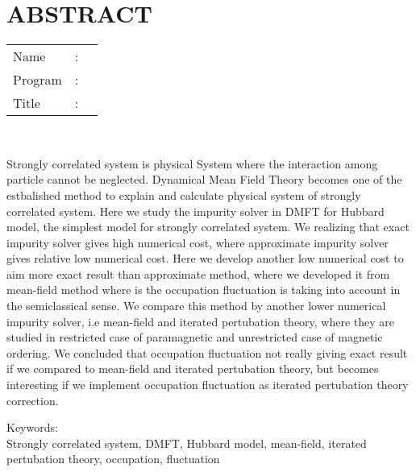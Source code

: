 %
%
%

\chapter*{ABSTRACT}

\vspace*{0.2cm}

\noindent \begin{tabular}{l l p{11.0cm}}
	Name&: & \penulis \\
	Program&: & \program \\
	Title&: & \judulInggris \\
\end{tabular} \\ 

\vspace*{0.5cm}

\noindent Strongly correlated system is physical System where the interaction among particle cannot be neglected. Dynamical Mean Field Theory becomes one of the estbalished method to explain and calculate physical system of strongly correlated system. Here we study the impurity solver in DMFT for Hubbard model, the simplest model for strongly correlated system. We realizing that exact impurity solver gives high numerical cost, where approximate impurity solver gives relative low numerical cost. Here we develop another low numerical cost to aim more exact result than approximate method, where we developed it from mean-field method where is the occupation fluctuation is taking into account in the semiclassical sense. We compare this method by another lower numerical impurity solver, i.e mean-field and iterated pertubation theory, where they are studied in restricted case of paramagnetic and unrestricted case of magnetic ordering. We concluded that occupation fluctuation not really giving exact result if we compared to mean-field and iterated pertubation theory, but becomes interesting if we implement occupation fluctuation as iterated pertubation theory correction.\\

\vspace*{0.2cm}

\noindent Keywords: \\ 
\noindent Strongly correlated system, DMFT, Hubbard model, mean-field, iterated pertubation theory, occupation, fluctuation

\newpage